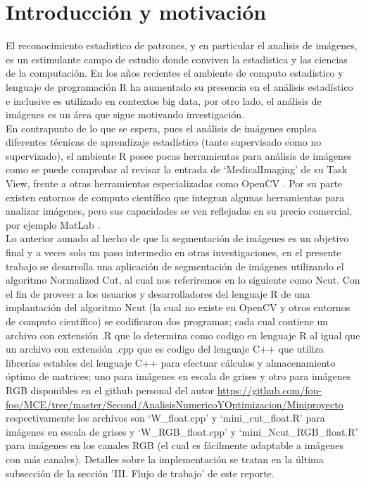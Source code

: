 \documentclass[conference]{IEEEtran}
\begin{document}
\IEEEpeerreviewmaketitle


\section{Introducción y motivación}
El reconocimiento estadistico de patrones, y en particular el analisis de imágenes, es un estimulante campo de estudio donde conviven la estadistica y las ciencias de la computación. En los años recientes el ambiente de computo estadistico y lenguaje de programación R \cite{R} ha aumentado su presencia en el análisis estadístico e inclusive es utilizado en contextos big data, por otro lado, el análisis de imágenes es un área que sigue motivando investigación.\\
En contrapunto de lo que se espera, pues el análisis de imágenes emplea diferentes técnicas de aprendizaje estadístico (tanto supervisado como no supervizado), el ambiente R posee pocas herramientas para análisis de imágenes como se puede comprobar al revisar la entrada de ‘MedicalImaging’ de su Task View,  frente a otras herramientas especializadas como OpenCV \cite{OpenCV}. Por su parte existen entornos de computo científico que integran algunas herramientas para analizar imágenes, pero sus capacidades se ven reflejadas en su precio comercial, por ejemplo MatLab \cite{MatLab}. \\
Lo anterior aunado al hecho de que la segmentación de imágenes es un objetivo final y a veces solo un paso intermedio en otras investigaciones, en el presente trabajo se desarrolla una aplicación de segmentación de imágenes utilizando el algoritmo Normalized Cut, al cual nos referiremos en lo siguiente como Ncut. Con el fin de proveer a los usuarios y desarrolladores del lenguaje R de una implantación del algoritmo Ncut (la cual no existe en OpenCV y otros entornos de computo científico) se codificaron dos programas; cada cual contiene un archivo con extensión .R que lo determina como codigo en lenguaje R al igual que un archivo con extensión .cpp que es codigo del lenguaje C++ que utiliza librerías estables del lenguaje C++ para efectuar cálculos y almacenamiento óptimo de matrices; uno para imágenes en escala de grises y otro para imágenes RGB disponibles en el github \cite{github} personal del autor \url{ https://github.com/fou-foo/MCE/tree/master/Second/AnalisisNumericoYOptimizacion/Miniproyecto } respectivamente los archivos son ‘W\_float.cpp’ y ‘mini\_cut\_float.R’ para imágenes en escala de grises y ‘W\_RGB\_float.cpp’ y ‘mini\_Ncut\_RGB\_float.R’ para imágenes en los canales RGB (el cual es fácilmente adaptable a imágenes con más canales). Detalles sobre la implementación se tratan en la última subsección de la sección 'III. Flujo de trabajo' de este reporte.\\
\end{document}
